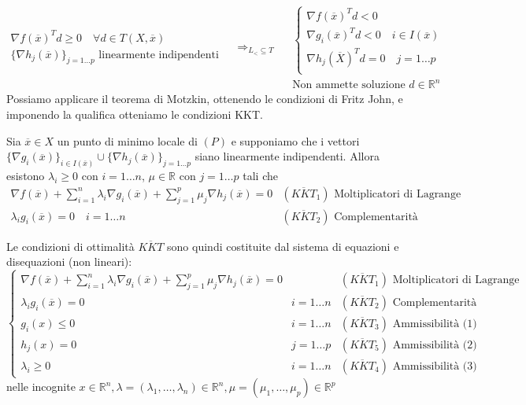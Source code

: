 $$
\begin{array}{l}
 \nabla f(\overline{x})^{T} d \geq 0\quad
\forall d \in T(X, \overline{x})   \\
\{ \nabla h_j(\overline{x})\}_{j=1\ldots p} \text{ linearmente
indipendenti}
\end{array}
\quad
\Longrightarrow_{L_{<} \subseteq T}
\quad
\begin{array}{l}
\left\{
\begin{array}{l}
  \nabla f(\overline{x})^{T}d < 0  \\
 \nabla g_i(\overline{x})^{T}d < 0 \quad i \in I(\overline{x}) \\
 \nabla h_j(\overline{X})^{T}d = 0 \quad j =1 \ldots p \\
\end{array}
\right. \\
\text{Non ammette soluzione } d \in \mathbb{R}^{n}
\end{array}
$$
Possiamo applicare il teorema di Motzkin, ottenendo le condizioni
di Fritz John, e imponendo la qualifica otteniamo le condizioni KKT.
\begin{theo}
Sia $\overline{x} \in X $ un punto di minimo locale di $(P)$ e supponiamo
che i vettori $\{ \nabla g_i(\overline{x})\}_{i \in I(\overline{x})} 
\cup
\{ \nabla h_j(\overline{x}) \}_{j=1\ldots p}
$
siano linearmente indipendenti. Allora esistono $\lambda_i \geq 0$
con $i=1\ldots n$,  $\mu \in \mathbb{R}$ con $j=1\ldots p$ tali che
$$
\begin{array}{ll}
\nabla f(\overline{x}) +
\displaystyle  \sum_{i=1}^{n} \lambda_i \nabla g_i (\overline{x})
+ \displaystyle \sum_{j=1}^{p} \mu_j \nabla h_j(\overline{x}) = 0 & 
(\overline{KKT}_1) \text{ Moltiplicatori di Lagrange }    \\
\lambda_i g_i(\overline{x})=0 \quad i =1 \ldots n &
(\overline{KKT}_2) \text{ Complementarit\`a}
\end{array}
$$
\end{theo}
Le condizioni di ottimalit\`a $\overline{KKT}$ sono quindi costituite dal sistema
di equazioni e disequazioni (non lineari):
$$
\left\{
\begin{array}{lll}
\nabla f(\overline{x}) +
\displaystyle  \sum_{i=1}^{n} \lambda_i \nabla g_i (\overline{x})
+ \displaystyle \sum_{j=1}^{p} \mu_j \nabla h_j(\overline{x}) = 0 & & 
(\overline{KKT}_1) \text{ Moltiplicatori di Lagrange }    \\
\lambda_i g_i(\overline{x})=0 & i =1 \ldots n &
(\overline{KKT}_2) \text{ Complementarit\`a} \\
g_i(x) \leq 0 & i=1\ldots n & (\overline{KKT}_3)  \text{ Ammissibilit\`a (1) } \\
h_j(x) = 0 & j=1\ldots p  & (\overline{KKT}_5)  \text{ Ammissibilit\`a (2) } \\
\lambda_i \geq 0 & i=1\ldots n  & (\overline{KKT}_4)  \text{ Ammissibilit\`a (3) }
\end{array}
\right.
$$
nelle incognite $x \in \mathbb{R}^{n}, \lambda = (\lambda_1, \ldots, \lambda_n) \in \mathbb{R}^{n}, \mu = (\mu_1, \ldots, \mu_p) \in \mathbb{R}^{p}$


